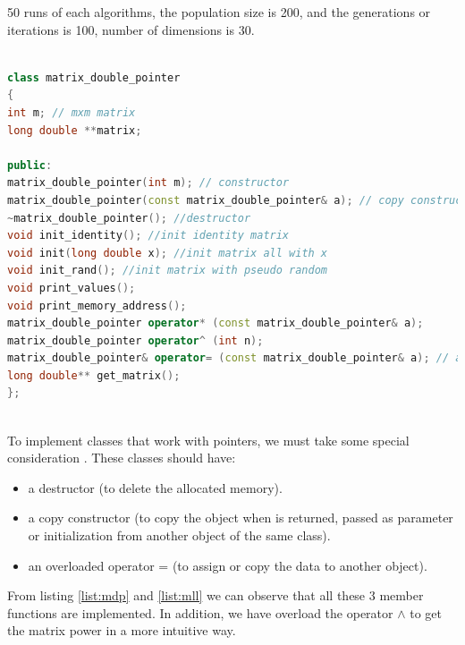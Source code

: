 \documentclass[12pt]{article}
\begin{document}
    
    50 runs of each algorithms, the population size is 200, and the generations or iterations is 100, number of dimensions is 30.
    \begin{lstlisting}[language=c++, caption={matrix\_double\_pointer class}, label={list:mdp}]

class matrix_double_pointer
{
int m; // mxm matrix
long double **matrix;

public:
matrix_double_pointer(int m); // constructor
matrix_double_pointer(const matrix_double_pointer& a); // copy constructor for return
~matrix_double_pointer(); //destructor
void init_identity(); //init identity matrix
void init(long double x); //init matrix all with x
void init_rand(); //init matrix with pseudo random 
void print_values();
void print_memory_address();
matrix_double_pointer operator* (const matrix_double_pointer& a);
matrix_double_pointer operator^ (int n);
matrix_double_pointer& operator= (const matrix_double_pointer& a); // assigment
long double** get_matrix();
};
    
    \end{lstlisting}
    To implement classes that work with pointers, we must take some special consideration \cite{class.pointer}. These classes should have:
    \begin{itemize}
        \item a destructor (to delete the allocated memory).
        \item a copy constructor (to copy the object when is returned, passed as parameter or initialization from another object of the same class). 
        \item an overloaded operator = (to assign or copy the data to another object).  
    \end{itemize}
     
From listing \ref{list:mdp} and \ref{list:mll} we can observe that all these 3 member functions are implemented. In addition, we have overload the operator $\wedge$ to get the matrix power in a more intuitive way. 
      
\end{document}
